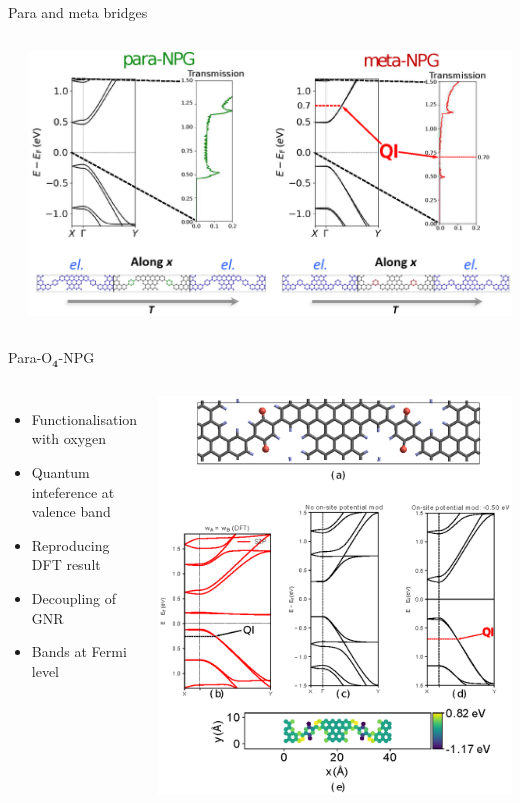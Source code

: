 \documentclass[hyperref={colorlinks=true,urlcolor=blue,linkcolor=.},aspectratio=1610,mathserif]{beamer}
\newcommand*\mathinhead[2]{\texorpdfstring{$\boldsymbol{#1}$}{#2}}
\begin{document}
\begin{frame}{Para and meta bridges}
\begin{overprint}
\begin{columns}[c]
\begin{itemize}
			\end{itemize}
			\includegraphics[height=.55\textwidth]{Figures/metapararesultdraft.eps}
		\end{columns}
	\end{overprint}
\end{frame}

\begin{frame}{Para-O\mathinhead{_4}{_4}-NPG}
	\centering
	\begin{columns}[c]
		\begin{itemize}
			\item Functionalisation with oxygen
			\item Quantum inteference at valence band
			\item Reproducing DFT result
			\item Decoupling of GNR
			\item Bands at Fermi level
		\end{itemize}
		\includegraphics[height=.8\textwidth]{Figures/fig19.eps}
	\end{columns}
\end{frame}
\end{document}
